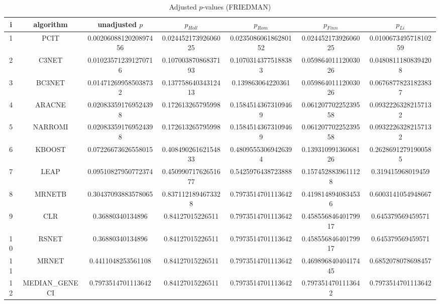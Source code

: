 \documentclass[a4paper,10pt]{article}
\begin{document}
\begin{landscape}
\begin{table}[!htp]
\centering\scriptsize
\caption{Adjusted $p$-values (FRIEDMAN)}
\begin{tabular}{ccccccc}
i&algorithm&unadjusted $p$&$p_{Holl}$&$p_{Rom}$&$p_{Finn}$&$p_{Li}$\\
\hline
1&PCIT&0.0020608812020897456&0.02445217392606025&0.023508606186280152&0.02445217392606025&0.010067349571810259\\
2&C3NET&0.010235712391270716&0.10700387086837193&0.10703143775188383&0.05986401112003026&0.04808111808394208\\
3&BC3NET&0.014712699585038732&0.13775864034312413&0.139863064220361&0.05986401112003026&0.06768778231823837\\
4&ARACNE&0.020833591769524398&0.172613265795998&0.15845143673109469&0.06120770225239558&0.09322263282157132\\
5&NARROMI&0.020833591769524398&0.172613265795998&0.15845143673109469&0.06120770225239558&0.09322263282157132\\
6&KBOOST&0.07226673626558015&0.40849026162154833&0.48095553069426394&0.13931099136068126&0.26286912791900585\\
7&LEAP&0.09510827950772374&0.45099071762651677&0.5425976438723888&0.1574528839611128&0.319415968019459\\
8&MRNETB&0.30437093883578065&0.8371121894673328&0.7973514701113642&0.4198148940834536&0.6003141054948667\\
9&CLR&0.36880340134896&0.84127015226511&0.7973514701113642&0.45855684640179917&0.645379569459571\\
10&RSNET&0.36880340134896&0.84127015226511&0.7973514701113642&0.45855684640179917&0.645379569459571\\
11&MRNET&0.4411048253561108&0.84127015226511&0.7973514701113642&0.46989684040417445&0.6852078078698457\\
12&MEDIAN_GENECI&0.7973514701113642&0.84127015226511&0.7973514701113642&0.7973514701113642&0.7973514701113642\\
\hline
\end{tabular}
\end{table}


\newpage


\end{landscape}
\end{document}
